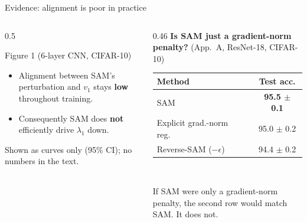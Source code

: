 \documentclass[aspectratio=169,10pt]{beamer}
\newcommand{\mt}[1]{\textcolor{muted}{#1}}
\newcommand{\best}[1]{\textbf{#1}}
\begin{document}
\begin{frame}{Evidence: alignment is poor in practice}
\begin{columns}[T]
\begin{column}{0.5\textwidth}
\begin{block}{Figure 1 (6-layer CNN, CIFAR-10)}
\begin{itemize}
  \item Alignment between SAM's perturbation and $v_1$ stays \textbf{low} throughout training.
  \item Consequently SAM does \textbf{not} efficiently drive $\lambda_1$ down.
\end{itemize}
\mt{\scriptsize Shown as curves only (95\% CI); no numbers in the text.}
\end{block}
\end{column}
\begin{column}{0.46\textwidth}
\centering\small
\textbf{Is SAM just a gradient-norm penalty?} \mt{(App.\ A, ResNet-18, CIFAR-10)}\\[4pt]
\begin{tabular}{@{}lc@{}}
\toprule
Method & Test acc.\\
\midrule
SAM & \best{95.5 $\pm$ 0.1}\\
Explicit grad.-norm reg.\ & 95.0 $\pm$ 0.2\\
Reverse-SAM ($-\epsilon$) & 94.4 $\pm$ 0.2\\
\bottomrule
\end{tabular}\\[6pt]
\raggedright\scriptsize
If SAM were only a gradient-norm penalty, the second row would match SAM. It does not.
\end{column}
\end{columns}
\end{frame}
\end{document}
